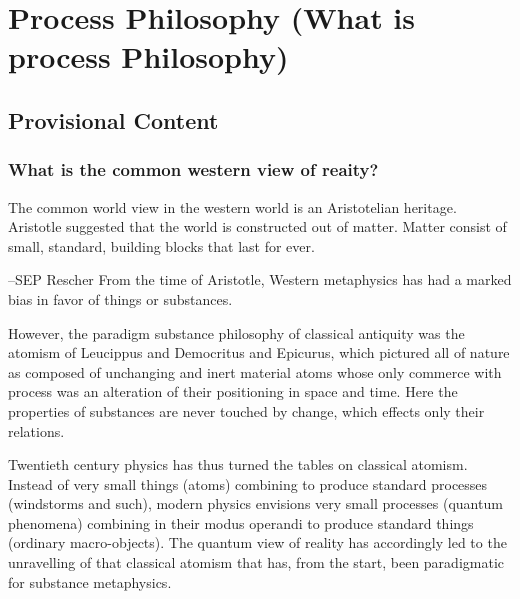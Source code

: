 \chapter{Process Philosophy (What is process Philosophy)}




\section{Provisional Content}

\subsection{What is the common western view of reaity?}
The common world view in the western world is an Aristotelian heritage. 
Aristotle suggested that the world is constructed out of matter. Matter consist of small, standard, building blocks that last for ever. 

--SEP Rescher
From the time of Aristotle, Western metaphysics has had a marked bias in favor of things or substances. 

However, the paradigm substance philosophy of classical antiquity was the atomism of Leucippus and Democritus and Epicurus, which pictured all of nature as composed of unchanging and inert material atoms whose only commerce with process was an alteration of their positioning in space and time. Here the properties of substances are never touched by change, which effects only their relations.

Twentieth century physics has thus turned the tables on classical atomism. Instead of very small things (atoms) combining to produce standard processes (windstorms and such), modern physics envisions very small processes (quantum phenomena) combining in their modus operandi to produce standard things (ordinary macro-objects). The quantum view of reality has accordingly led to the unravelling of that classical atomism that has, from the start, been paradigmatic for substance metaphysics.

